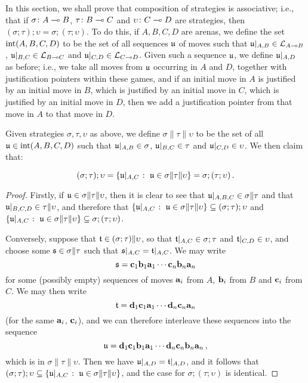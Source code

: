 In this section, we shall prove that composition of strategies is associative; i.e., that if $\sigma\colon A \multimap B$, $\tau\colon B\multimap C$ and $\upsilon \colon C \multimap D$ are strategies, then $(\sigma;\tau);\upsilon=\sigma;(\tau;\upsilon)$.  
To do this, if $A,B,C,D$ are arenas, we define the set $\operatorname{int}(A,B,C,D)$ to be the set of all sequences $\mathfrak u$ of moves such that $\mathfrak u\vert_{A,B}\in \mathcal L_{A\multimap B}$, $\mathfrak u\vert_{B,C}\in \mathcal L_{B\multimap C}$ and $\mathfrak u\vert_{C,D}\in \mathcal L_{C \multimap D}$.  
Given such a sequence $\mathfrak u$, we define $\mathfrak u\vert_{A,D}$ as before; i.e., we take all moves from $\mathfrak u$ occurring in $A$ and $D$, together with justification pointers within these games, and if an initial move in $A$ is justified by an initial move in $B$, which is justified by an initial move in $C$, which is justified by an initial move in $D$, then we add a justification pointer from that move in $A$ to that move in $D$.

Given strategies $\sigma,\tau,\upsilon$ as above, we define $\sigma\|\tau\|\upsilon$ to be the set of all $\mathfrak u\in\operatorname{int}(A,B,C,D)$ such that $\mathfrak u\vert_{A,B}\in\sigma$, $\mathfrak u\vert_{B,C}\in\tau$ and $\mathfrak u\vert_{C,D}\in\upsilon$.
We then claim that:

\begin{proposition}
  \[
    (\sigma;\tau);\upsilon = \{\mathfrak u\vert_{A,C}\;\colon\; \mathfrak u\in\sigma\|\tau\|\upsilon\} = \sigma;(\tau;\upsilon)\,.
    \]
  \label{PropAssociativityOfComposition}
\end{proposition}
\begin{proof}
  Firstly, if $\mathfrak u\in\sigma\|\tau\|\upsilon$, then it is clear to see that $\mathfrak u\vert_{A,B,C}\in\sigma\|\tau$ and that $\mathfrak u\vert_{B,C,D}\in\tau\|\upsilon$, and therefore that $\{\mathfrak u\vert_{A,C}\;\colon\; \mathfrak u\in\sigma\|\tau\|\upsilon\}\subseteq (\sigma;\tau);\upsilon$ and $\{\mathfrak u\vert_{A,C}\;\colon\; \mathfrak u\in\sigma\|\tau\|\upsilon\}\subseteq \sigma;(\tau;\upsilon)$. 

  Conversely, suppose that $\mathfrak t\in(\sigma;\tau)\|\upsilon$, so that $\mathfrak t\vert_{A,C}\in\sigma;\tau$ and $\mathfrak t\vert_{C,D}\in\upsilon$, and choose some $\mathfrak s\in\sigma\|\tau$ such that $\mathfrak s\vert_{A,C}=\mathfrak t\vert_{A,C}$.
  We may write 
  \[
    \mathfrak s=\mathbf{c}_1\mathbf{b}_1\mathbf{a}_1\cdots \mathbf{c}_n\mathbf{b}_n\mathbf{a}_n
    \]
  for some (possibly empty) sequences of moves $\mathbf{a}_i$ from $A$, $\mathbf{b}_i$ from $B$ and $\mathbf{c}_i$ from $C$.  
  We may then write 
  \[
    \mathfrak t=\mathbf{d}_1\mathbf{c}_1\mathbf{a}_1\cdots\mathbf{d}_n\mathbf{c}_n\mathbf{a}_n
    \]
  (for the same $\mathbf{a}_i$, $\mathbf{c}_i$), and we can therefore interleave these sequences into the sequence
  \[
    \mathfrak u = \mathbf{d}_1\mathbf{c}_1\mathbf{b}_1\mathbf{a}_1\cdots\mathbf{d}_n\mathbf{c}_n\mathbf{b}_n\mathbf{a}_n\,,
    \]
  which is in $\sigma\|\tau\|\upsilon$.
  Then we have $\mathfrak u\vert_{A,D}=\mathfrak t\vert_{A,D}$, and it follows that $(\sigma;\tau);\upsilon\subseteq\{\mathfrak u\vert_{A,C}\;\colon\; \mathfrak u\in\sigma\|\tau\|\upsilon\}$, and the case for $\sigma;(\tau;\upsilon)$ is identical.
\end{proof}

